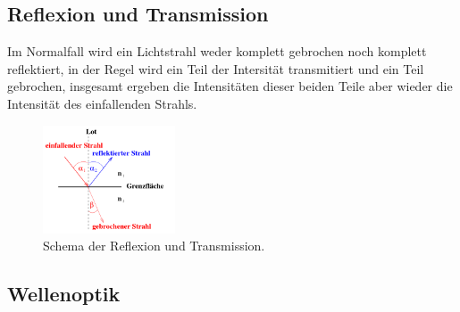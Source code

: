     \subsection{Reflexion und Transmission}

        \noindent Im Normalfall wird ein Lichtstrahl weder komplett gebrochen noch komplett reflektiert, in der Regel wird ein Teil der Intersität 
        transmitiert und ein Teil gebrochen, insgesamt ergeben die Intensitäten dieser beiden Teile aber wieder die Intensität des einfallenden 
        Strahls.

        \begin{figure}[H]
            \centering
            \includegraphics[width=0.35\textwidth]{latex/images/T4.PNG}
            \caption{Schema der Reflexion und Transmission\protect \cite{400}.}
        \end{figure}

    \subsection{Wellenoptik}
        

